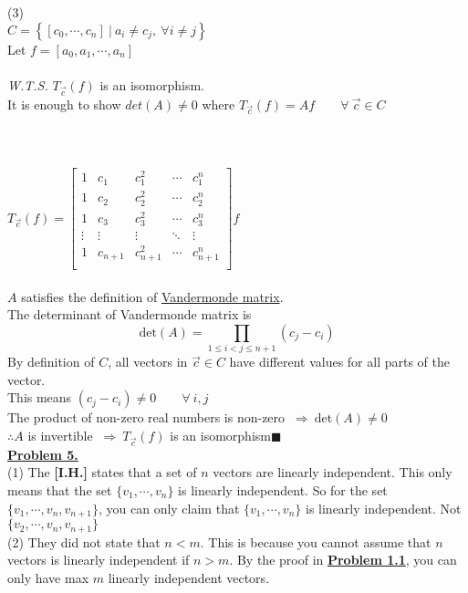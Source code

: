 \documentclass[12pt]{article}
\newcommand{\R}{\mathbb{R}}
\renewcommand{\qed}{\hfill$\blacksquare$}
\newcommand\myalign[1]{\alignShortstack{\strut#1\strut}}
\begin{document}
(3)\\
$C= \left\{ [c_0, \cdots, c_n] \ | \ a_i \not = c_j, \ \forall i \not = j\right\}$\\
Let $f = [a_0, a_1, \cdots, a_n]$
\\\\
\emph{W.T.S.} $T_{\vec{c}}(f)$ is an isomorphism.\\
It is enough to show $det(A) \not = 0$ where $T_{\vec{c}}(f) = Af \qquad \forall \ \vec{c} \in C$
\\\\
\myalign{
	\text{\emph{dim}}(\R ^{n+1})\ &=\ n+1 \\
	\text{\emph{dim}}(\mathcal{P}_n)\ &=\ n+1
}
\\\\
$T_{\vec{c}}(f) = \begin{bmatrix}
		1      & c_1     & c_1^2     & \cdots & c_1^n     \\
		1      & c_2     & c_2^2     & \cdots & c_2^n     \\
		1      & c_3     & c_3^2     & \cdots & c_3^n     \\
		\vdots & \vdots  & \vdots    & \ddots & \vdots    \\
		1      & c_{n+1} & c_{n+1}^2 & \cdots & c_{n+1}^n \\
	\end{bmatrix} f$
\\\\
$A$ satisfies the definition of \href{https://en.wikipedia.org/wiki/Vandermonde_matrix}{Vandermonde matrix}. \\
The determinant of Vandermonde matrix is
\[\text{det}(A) = \prod_{1\leq i<j\leq n+1} (c_j -c_i)\]
By definition of $C$, all vectors in $\vec{c} \in C$ have different values for all parts of the vector. \\
This means $(c_j -c_i) \not = 0 \qquad \forall \ i,j$\\
The product of non-zero real numbers is non-zero $\ \Longrightarrow \ \text{det}(A) \not = 0$\\
$\therefore A$ is invertible $\ \Longrightarrow \ T_{\vec{c}}(f)$ is an isomorphism\qed\\

\newpage
{\LARGE \noindent \underline{\textbf{Problem 5.}}}\\

(1) The \textbf{[I.H.]} states that a set of $n$ vectors are linearly independent.
This only means that the set $\{v_1, \cdots, v_n\}$ is linearly independent.
So for the set $\{v_1, \cdots, v_n, v_{n+1}\}$, you can only claim that
$\{v_1, \cdots, v_n\}$ is linearly independent. Not $\{v_2, \cdots, v_n, v_{n+1}\}$\\

(2) They did not state that $n < m$. This is because you cannot assume that $n$
vectors is linearly independent if $n > m$. By the proof in \textbf{\underline{Problem 1.1}},
you can only have max $m$ linearly independent vectors.
\end{document}
